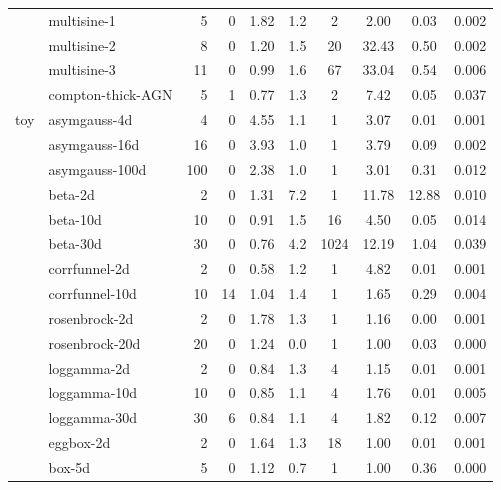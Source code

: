 \begin{tabular}{ll|rrcccccc}
                     & multisine-1          & 5   & 0    & 1.82 & 1.2 &    2 & 2.00 & 0.03 & 0.002 \\
                     & multisine-2          & 8   & 0    & 1.20 & 1.5 &   20 & 32.43 & 0.50 & 0.002 \\
                     & multisine-3          & 11  & 0    & 0.99 & 1.6 &   67 & 33.04 & 0.54 & 0.006 \\
                     & compton-thick-AGN    & 5   & 1    & 0.77 & 1.3 &    2 & 7.42 & 0.05 & 0.037 \\
\hline
toy                  & asymgauss-4d         & 4   & 0    & 4.55 & 1.1 &    1 & 3.07 & 0.01 & 0.001 \\
                     & asymgauss-16d        & 16  & 0    & 3.93 & 1.0 &    1 & 3.79 & 0.09 & 0.002 \\
                     & asymgauss-100d       & 100 & 0    & 2.38 & 1.0 &    1 & 3.01 & 0.31 & 0.012 \\
                     & beta-2d              & 2   & 0    & 1.31 & 7.2 &    1 & 11.78 & 12.88 & 0.010 \\
                     & beta-10d             & 10  & 0    & 0.91 & 1.5 &   16 & 4.50 & 0.05 & 0.014 \\
                     & beta-30d             & 30  & 0    & 0.76 & 4.2 & 1024 & 12.19 & 1.04 & 0.039 \\
                     & corrfunnel-2d        & 2   & 0    & 0.58 & 1.2 &    1 & 4.82 & 0.01 & 0.001 \\
                     & corrfunnel-10d       & 10  & 14   & 1.04 & 1.4 &    1 & 1.65 & 0.29 & 0.004 \\
                     & rosenbrock-2d        & 2   & 0    & 1.78 & 1.3 &    1 & 1.16 & 0.00 & 0.001 \\
                     & rosenbrock-20d       & 20  & 0    & 1.24 & 0.0 &    1 & 1.00 & 0.03 & 0.000 \\
                     & loggamma-2d          & 2   & 0    & 0.84 & 1.3 &    4 & 1.15 & 0.01 & 0.001 \\
                     & loggamma-10d         & 10  & 0    & 0.85 & 1.1 &    4 & 1.76 & 0.01 & 0.005 \\
                     & loggamma-30d         & 30  & 6    & 0.84 & 1.1 &    4 & 1.82 & 0.12 & 0.007 \\
                     & eggbox-2d            & 2   & 0    & 1.64 & 1.3 &   18 & 1.00 & 0.01 & 0.001 \\
                     & box-5d               & 5   & 0    & 1.12 & 0.7 &    1 & 1.00 & 0.36 & 0.000 \\

\end{tabular}
